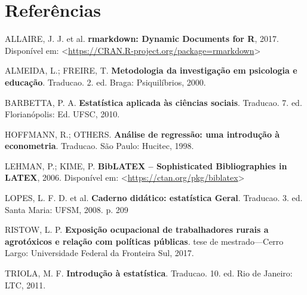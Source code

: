 \documentclass[12pt,portuguese,oneside]{book}
\begin{document}
\chapter*{Referências}\label{referencias}

\hypertarget{refs}{}
\hypertarget{ref-R-rmarkdown}{}
ALLAIRE, J. J. et al. \textbf{rmarkdown: Dynamic Documents for R}, 2017.
Disponível em:
\textless{}\url{https://CRAN.R-project.org/package=rmarkdown}\textgreater{}

\hypertarget{ref-almeida2000}{}
ALMEIDA, L.; FREIRE, T. \textbf{Metodologia da investigação em
psicologia e educação}. Traducao. 2. ed. Braga: Psiquilíbrios, 2000.

\hypertarget{ref-barbetta1988}{}
BARBETTA, P. A. \textbf{Estatística aplicada às ciências sociais}.
Traducao. 7. ed. Florianópolis: Ed. UFSC, 2010.

\hypertarget{ref-hoffmann1998}{}
HOFFMANN, R.; OTHERS. \textbf{Análise de regressão: uma introdução à
econometria}. Traducao. São Paulo: Hucitec, 1998.

\hypertarget{ref-biblatex}{}
LEHMAN, P.; KIME, P. \textbf{BibLATEX -- Sophisticated Bibliographies in
LATEX}, 2006. Disponível em:
\textless{}\url{https://ctan.org/pkg/biblatex}\textgreater{}

\hypertarget{ref-lopes2008}{}
LOPES, L. F. D. et al. \textbf{Caderno didático: estatística Geral}.
Traducao. 3. ed. Santa Maria: UFSM, 2008. p. 209

\hypertarget{ref-Ristow2017}{}
RISTOW, L. P. \textbf{Exposição ocupacional de trabalhadores rurais a
agrotóxicos e relação com políticas públicas}. tese de mestrado---Cerro
Largo: Universidade Federal da Fronteira Sul, 2017.

\hypertarget{ref-triola1999}{}
TRIOLA, M. F. \textbf{Introdução à estatística}. Traducao. 10. ed. Rio
de Janeiro: LTC, 2011.
\end{document}
